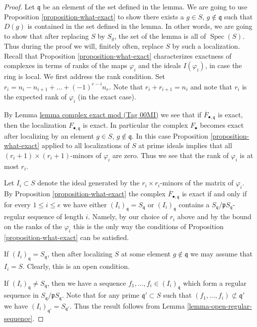 \documentclass{amsart}
\theoremstyle{plain}
\theoremstyle{definition}
\theoremstyle{remark}
\numberwithin{equation}{subsection}
\def\Spec{\mathop{\mathrm{Spec}}}
\begin{document}
\begin{proof}
Let $\mathfrak q$ be an element of the set defined in the lemma.
We are going to use Proposition \ref{proposition-what-exact}
to show there exists a $g \in S$, $g \not \in \mathfrak q$
such that $D(g)$ is contained in the set defined in the lemma.
In other words, we are going to show that after replacing $S$
by $S_g$, the set of the lemma is all of $\Spec(S)$.
Thus during the proof we will, finitely often, replace
$S$ by such a localization.
Recall that Proposition \ref{proposition-what-exact}
characterizes exactness of complexes
in terms of ranks of the maps $\varphi_i$ and the ideals
$I(\varphi_i)$, in case the ring is local. We first address
the rank condition. Set
$r_i = n_i - n_{i + 1} + \ldots + (-1)^{e - i} n_e$.
Note that $r_i + r_{i + 1} = n_i$ and note that
$r_i$ is the expected rank of $\varphi_i$ (in the
exact case).

\medskip\noindent
By Lemma \href{https://stacks.math.columbia.edu/tag/00MI}{lemma complex exact mod (Tag 00MI)} we see that if
$\overline{F}_{\bullet, \mathfrak q}$ is exact, then
the localization $F_{\bullet, \mathfrak q}$ is exact.
In particular the complex $F_\bullet$ becomes
exact after localizing by an element
$g \in S$, $g \not \in \mathfrak q$. In this case
Proposition \ref{proposition-what-exact} applied
to all localizations of $S$ at prime ideals
implies that all $(r_i + 1) \times (r_i + 1)$-minors
of $\varphi_i$ are zero. Thus we see that the rank
of $\varphi_i$ is at most $r_i$.

\medskip\noindent
Let $I_i \subset S$ denote the ideal generated
by the $r_i \times r_i$-minors of the matrix
of $\varphi_i$. By Proposition \ref{proposition-what-exact}
the complex $\overline{F}_{\bullet, \mathfrak q}$ is exact
if and only if for every $1 \leq i \leq e$ we have
either $(I_i)_{\mathfrak q} = S_{\mathfrak q}$ or
$(I_i)_{\mathfrak q}$ contains a $S_{\mathfrak q}/\mathfrak p
S_{\mathfrak q}$-regular sequence of length $i$.
Namely, by our choice of $r_i$ above and by the
bound on the ranks of the $\varphi_i$ this is the
only way the conditions of Proposition \ref{proposition-what-exact}
can be satisfied.

\medskip\noindent
If $(I_i)_{\mathfrak q} = S_{\mathfrak q}$, then after localizing $S$ at
some element $g \not\in \mathfrak q$ we may assume that
$I_i = S$. Clearly, this is an open condition.

\medskip\noindent
If $(I_i)_{\mathfrak q} \not = S_{\mathfrak q}$, then we have
a sequence $f_1, \ldots, f_i \in (I_i)_{\mathfrak q}$ which
form a regular sequence in $S_{\mathfrak q}/\mathfrak pS_{\mathfrak q}$.
Note that for any prime $\mathfrak q' \subset S$ such that
$(f_1, \ldots, f_i) \not \subset \mathfrak q'$ we have
$(I_i)_{\mathfrak q'} = S_{\mathfrak q'}$.
Thus the result follows from Lemma \ref{lemma-open-regular-sequence}.
\end{proof}
\end{document}
